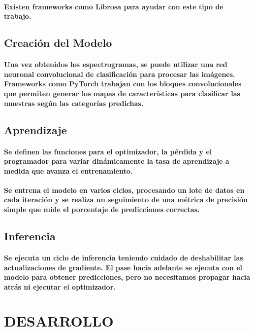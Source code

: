 \documentclass[a4paper,11pt,twocolumn]{article}
\newcommand{\sectionformat}{\centering}
\begin{document}
\paragraph{Existen frameworks como Librosa para ayudar con este tipo de trabajo\cite{librosa}.}
\subsection{Creación del Modelo}
\paragraph{Una vez obtenidos los espectrogramas, se puede utilizar una red neuronal convolucional de clasificación para procesar las imágenes. Frameworks como PyTorch trabajan con los bloques convolucionales que permiten generar los mapas de características para clasificar las muestras según las categorías predichas\cite{tp}.}
\subsection{Aprendizaje}
\paragraph{Se definen las funciones para el optimizador, la pérdida y el programador para variar dinámicamente la tasa de aprendizaje a medida que avanza el entrenamiento.}
\paragraph{Se entrena el modelo en varios ciclos, procesando un lote de datos en cada iteración y se realiza un seguimiento de una métrica de precisión simple que mide el porcentaje de predicciones correctas\cite{tp}.}
\subsection{Inferencia}
\paragraph{Se ejecuta un ciclo de inferencia teniendo cuidado de deshabilitar las actualizaciones de gradiente. El pase hacia adelante se ejecuta con el modelo para obtener predicciones, pero no necesitamos propagar hacia atrás ni ejecutar el optimizador\cite{tp}.}
\section{\sectionformat DESARROLLO}
\end{document}
